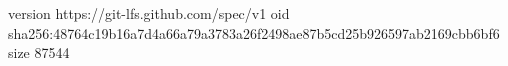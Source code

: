 version https://git-lfs.github.com/spec/v1
oid sha256:48764c19b16a7d4a66a79a3783a26f2498ae87b5cd25b926597ab2169cbb6bf6
size 87544
